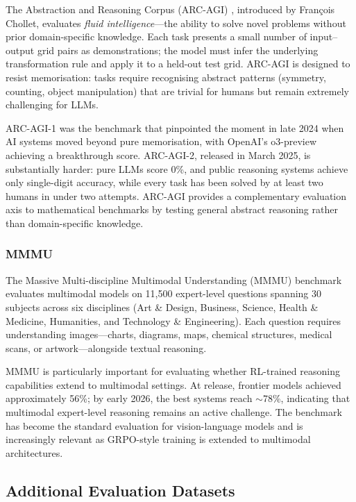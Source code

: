 \documentclass[12pt,a4paper]{report}
\theoremstyle{definition}
\begin{document}
The Abstraction and Reasoning Corpus (ARC-AGI) \cite{chollet2019arc}, introduced by Fran\c{c}ois Chollet, evaluates \emph{fluid intelligence}---the ability to solve novel problems without prior domain-specific knowledge. Each task presents a small number of input--output grid pairs as demonstrations; the model must infer the underlying transformation rule and apply it to a held-out test grid. ARC-AGI is designed to resist memorisation: tasks require recognising abstract patterns (symmetry, counting, object manipulation) that are trivial for humans but remain extremely challenging for LLMs.

ARC-AGI-1 was the benchmark that pinpointed the moment in late 2024 when AI systems moved beyond pure memorisation, with OpenAI's o3-preview achieving a breakthrough score. ARC-AGI-2, released in March 2025, is substantially harder: pure LLMs score 0\%, and public reasoning systems achieve only single-digit accuracy, while every task has been solved by at least two humans in under two attempts. ARC-AGI provides a complementary evaluation axis to mathematical benchmarks by testing general abstract reasoning rather than domain-specific knowledge.

\subsubsection{MMMU}

The Massive Multi-discipline Multimodal Understanding (MMMU) benchmark \cite{yue2024mmmu} evaluates multimodal models on 11,500 expert-level questions spanning 30 subjects across six disciplines (Art \& Design, Business, Science, Health \& Medicine, Humanities, and Technology \& Engineering). Each question requires understanding images---charts, diagrams, maps, chemical structures, medical scans, or artwork---alongside textual reasoning.

MMMU is particularly important for evaluating whether RL-trained reasoning capabilities extend to multimodal settings. At release, frontier models achieved approximately 56\%; by early 2026, the best systems reach $\sim$78\%, indicating that multimodal expert-level reasoning remains an active challenge. The benchmark has become the standard evaluation for vision-language models and is increasingly relevant as GRPO-style training is extended to multimodal architectures.

\subsection{Additional Evaluation Datasets}
\end{document}
